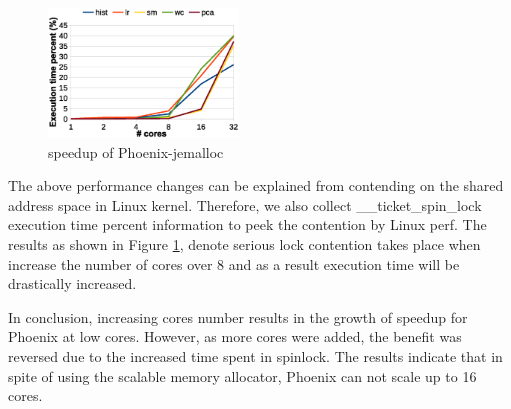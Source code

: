 \begin{figure}[!h!t]  
	\centering
	\includegraphics[width=0.45\textwidth]{eps/phoenix_spinlock_jemalloc.eps}
	\caption{speedup of Phoenix-jemalloc}
	\label{fig:phoenix:spinlock:jemalloc}
\end{figure}
The above performance changes can be explained from contending on the shared address space in Linux kernel.
Therefore, we also collect \_\_ticket\_spin\_lock execution time percent information to peek the contention by Linux perf.
The results as shown in Figure \ref{fig:phoenix:spinlock:jemalloc}, denote serious lock contention takes place when increase the number of cores over 8 and as a result execution time will be drastically increased.



In conclusion, increasing cores number results in the growth of speedup for Phoenix at low cores.
However, as more cores were added, the benefit was reversed due to the increased time spent in spinlock.
The results indicate that in spite of using the scalable memory allocator, Phoenix can not scale up to 16 cores.




